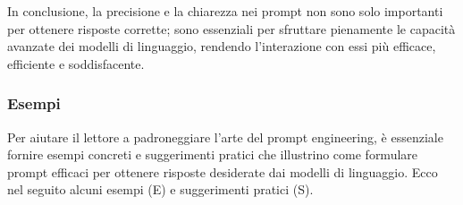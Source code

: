             In conclusione, la precisione e la chiarezza nei prompt non sono solo importanti per ottenere risposte corrette; sono essenziali per sfruttare pienamente le capacità avanzate dei modelli di linguaggio, rendendo l'interazione con essi più efficace, efficiente e soddisfacente.
            
        \subsubsection{Esempi}
            Per aiutare il lettore a padroneggiare l'arte del prompt engineering, è essenziale fornire esempi concreti e suggerimenti pratici che illustrino come formulare prompt efficaci per ottenere risposte desiderate dai modelli di linguaggio. Ecco nel seguito alcuni esempi (E) e suggerimenti pratici (S).

